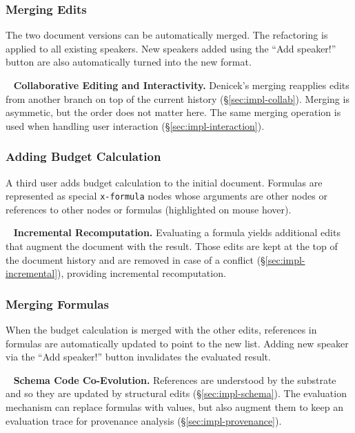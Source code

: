 \documentclass[sigconf,anonymous,screen]{acmart}
\newcommand*\circled[1]{\textnormal{\footnotesize\sffamily\bfseries\protect\tikz[baseline=(char.base)]{
  \node[shape=circle,fill=black,text=white,draw,inner sep=1pt] (char) {#1};}}}
\DeclareRobustCommand{\keyideabox}[3]{\begin{tcolorbox}[breakable,
  boxsep=5pt,left=0pt,right=0pt,top=0pt,bottom=0pt,width=\dimexpr\columnwidth\relax,
  colback=gray!20,colframe=gray!20,
  enlarge bottom by=0pt,enlarge top by=0pt,
  arc=0pt,outer arc=0pt]
\lettrine[lraise=0.3]{\LARGE #1}{~}
\small \textbf{#2.} #3
\end{tcolorbox}
}
\begin{document}
\subsubsection*{\circled{E} Merging Edits} The two document versions can be automatically merged.
The refactoring is applied to all existing speakers. New speakers added using the ``Add speaker!''
button are also automatically turned into the new format.

\keyideabox{\faLightbulbO}{Collaborative Editing and Interactivity}{Denicek's merging
reapplies edits from another branch on top of the current history (\S\ref{sec:impl-collab}).
Merging is asymmetic, but the order does not matter here. The same merging operation is used
when handling user interaction (\S\ref{sec:impl-interaction}).}

\subsubsection*{\circled{F} Adding Budget Calculation} A third user adds budget calculation to
the initial document. Formulas are represented as special {\small\Verb_x-formula_} nodes whose arguments
are other nodes or references to other nodes or formulas (highlighted on mouse hover).

\keyideabox{\faLightbulbO}{Incremental Recomputation}{Evaluating a formula yields additional
edits that augment the document with the result. Those edits are kept
at the top of the document history and are removed in case of a conflict (\S\ref{sec:impl-incremental}),
providing incremental recomputation.}

\subsubsection*{\circled{G} Merging Formulas} When the budget calculation is merged with the
other edits, references in formulas are automatically updated to point to the new list.
Adding new speaker via the ``Add speaker!'' button invalidates the evaluated result.

\keyideabox{\faLightbulbO}{Schema Code Co-Evolution}{References are understood
by the substrate and so they are updated by structural edits (\S\ref{sec:impl-schema}). The
evaluation mechanism can replace formulas with values, but also augment them to keep an evaluation
trace for provenance analysis (\S\ref{sec:impl-provenance}).}

\end{document}
